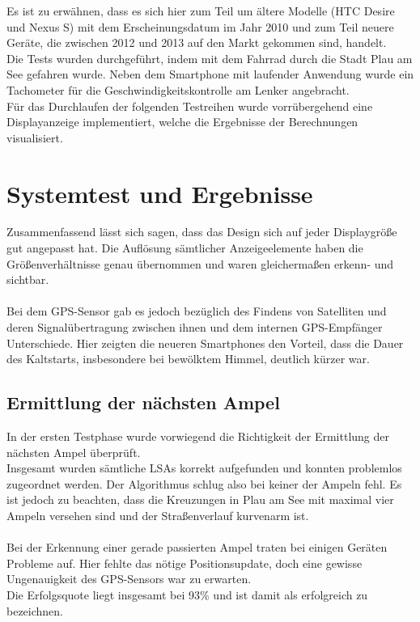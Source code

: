 Es ist zu erwähnen, dass es sich hier zum Teil um ältere Modelle (HTC Desire und Nexus S) mit dem Erscheinungsdatum im Jahr 2010 und zum Teil neuere Geräte, die zwischen 2012 und 2013 auf den Markt gekommen sind, handelt. \\
Die Tests wurden durchgeführt, indem mit dem Fahrrad durch die Stadt Plau am See gefahren wurde. Neben dem \gls{Smartphone} mit laufender Anwendung wurde ein Tachometer für die Geschwindigkeitskontrolle am Lenker angebracht. \\
Für das Durchlaufen der folgenden Testreihen wurde vorrübergehend eine Displayanzeige implementiert, welche die Ergebnisse der Berechnungen visualisiert.
\section{Systemtest und Ergebnisse}
Zusammenfassend lässt sich sagen, dass das Design sich auf jeder Displaygröße gut angepasst hat. Die Auflösung sämtlicher Anzeigeelemente haben die Größenverhältnisse genau übernommen und waren gleichermaßen erkenn- und sichtbar.\\\\
Bei dem \gls{GPS}-Sensor gab es jedoch bezüglich des Findens von Satelliten und deren Signalübertragung zwischen ihnen und dem internen \gls{GPS}-Empfänger Unterschiede. Hier zeigten die neueren \glspl{Smartphone} den Vorteil, dass die Dauer des Kaltstarts, insbesondere bei bewölktem Himmel, deutlich kürzer war.
%
%
\subsection{Ermittlung der nächsten Ampel}
In der ersten Testphase wurde vorwiegend die Richtigkeit der Ermittlung der nächsten Ampel überprüft.\\
Insgesamt wurden sämtliche \glspl{LSA} korrekt aufgefunden und konnten problemlos zugeordnet werden. Der Algorithmus schlug also bei keiner der Ampeln fehl. Es ist jedoch zu beachten, dass die Kreuzungen in Plau am See mit maximal vier Ampeln versehen sind und der Straßenverlauf kurvenarm ist.\\\\
Bei der Erkennung einer gerade passierten Ampel traten bei einigen Geräten Probleme auf. Hier fehlte das nötige Positionsupdate, doch eine gewisse Ungenauigkeit des \gls{GPS}-Sensors war zu erwarten.\\ 
Die Erfolgsquote liegt insgesamt bei 93\% und ist damit als erfolgreich zu bezeichnen. 
%
%
